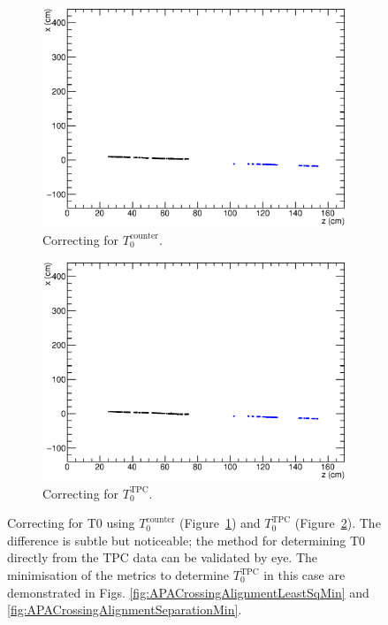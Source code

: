 \begin{figure}
  \centering
  \begin{subfigure}[t]{0.48\linewidth}
    \centering
    \includegraphics[width=\textwidth]{t0correction_before.eps}
    \caption{Correcting for $T_0^{\mathrm{counter}}$.}
    \label{fig:TPCCounterT0CorrectionCounter}
  \end{subfigure}
  \hfill
  \begin{subfigure}[t]{0.48\linewidth}
    \centering
    \includegraphics[width=\textwidth]{t0correction_after.eps}
    \caption{Correcting for $T_0^{\mathrm{TPC}}$.}
    \label{fig:TPCCounterT0CorrectionTPC}
  \end{subfigure}
  \caption[Correcting for T0 using $T_0^{\mathrm{counter}}$ and $T_0^{\mathrm{TPC}}$.]{Correcting for T0 using $T_0^{\mathrm{counter}}$ (Figure~\ref{fig:TPCCounterT0CorrectionCounter}) and $T_0^{\mathrm{TPC}}$ (Figure~\ref{fig:TPCCounterT0CorrectionTPC}).  The difference is subtle but noticeable; the method for determining T0 directly from the TPC data can be validated by eye.  The minimisation of the metrics to determine $T_0^{\mathrm{TPC}}$ in this case are demonstrated in Figs. \ref{fig:APACrossingAlignmentLeastSqMin} and \ref{fig:APACrossingAlignmentSeparationMin}.}
  \label{fig:TPCCounterT0Correction}
\end{figure}

